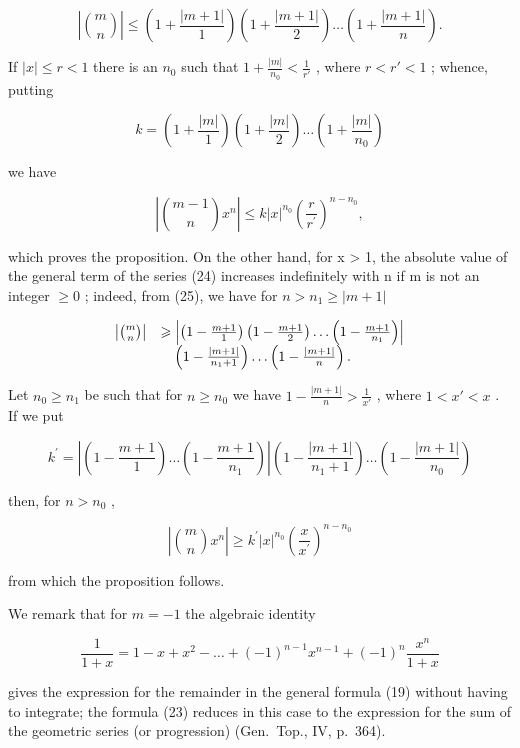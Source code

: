 \[
\left| \binom {m} {n} \right| \leqslant \left(1 + \frac {| m + 1 |}{1}\right) \left(1 + \frac {| m + 1 |}{2}\right) \dots \left(1 + \frac {| m + 1 |}{n}\right).
\]

If \(|x| \leqslant r < 1\) there is an \(n_0\) such that \(1 + \frac{|m|}{n_0} < \frac{1}{r'}\) , where \(r < r' < 1\) ; whence, putting

\[
k = \left(1 + \frac {| m |}{1}\right) \left(1 + \frac {| m |}{2}\right) \dots \left(1 + \frac {| m |}{n _ {0}}\right)
\]

we have

\[
\left| \binom {m - 1} {n} x ^ {n} \right| \leqslant k | x | ^ {n _ {0}} \left(\frac {r}{r ^ {\prime}}\right) ^ {n - n _ {0}},
\]

which proves the proposition. On the other hand, for x \textgreater{} 1, the absolute value of the general term of the series (24) increases indefinitely with n if m is not an integer \(\geqslant 0\) ; indeed, from (25), we have for \(n > n_{1} \geqslant |m + 1|\)

\[
\begin{array}{r l} \left| \binom {m} {n} \right| & \geqslant \left| \left(1 - \frac {m + 1}{1}\right) \left(1 - \frac {m + 1}{2}\right) \dots \left(1 - \frac {m + 1}{n _ {1}}\right) \right| \\ & \quad \left(1 - \frac {| m + 1 |}{n _ {1} + 1}\right) \dots \left(1 - \frac {| m + 1 |}{n}\right). \end{array}
\]

Let \(n_0 \geqslant n_1\) be such that for \(n \geqslant n_0\) we have \(1 - \frac{|m + 1|}{n} > \frac{1}{x'}\) , where \(1 < x' < x\) . If we put

\[
k ^ {\prime} = \left| \left(1 - \frac {m + 1}{1}\right) \dots \left(1 - \frac {m + 1}{n _ {1}}\right) \right| \left(1 - \frac {| m + 1 |}{n _ {1} + 1}\right) \dots \left(1 - \frac {| m + 1 |}{n _ {0}}\right)
\]

then, for \(n > n_0\) ,

\[
\left| \binom {m} {n} x ^ {n} \right| \geqslant k ^ {\prime} | x | ^ {n _ {0}} \left(\frac {x}{x ^ {\prime}}\right) ^ {n - n _ {0}}
\]

from which the proposition follows.

We remark that for \(m = -1\) the algebraic identity

\[
\frac {1}{1 + x} = 1 - x + x ^ {2} - \dots + (- 1) ^ {n - 1} x ^ {n - 1} + (- 1) ^ {n} \frac {x ^ {n}}{1 + x}\tag{26}
\]

gives the expression for the remainder in the general formula (19) without having to integrate; the formula (23) reduces in this case to the expression for the sum of the geometric series (or progression) (Gen.~Top., IV, p.~364).

